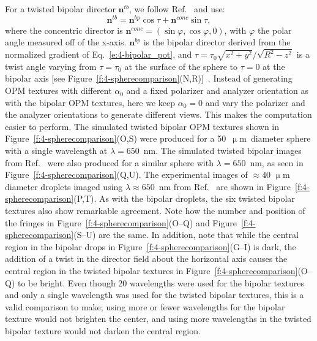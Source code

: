 For a twisted bipolar director $\mathbf{n}^{tb}$, we follow Ref.~\cite{RN177} and use:
\begin{equation}
\mathbf{n}^{tb} = \mathbf{n}^{bp}\cos\tau +\mathbf{n}^{conc}\sin\tau,
\end{equation}
where the concentric director is $\mathbf{n}^{conc} = (\sin \varphi,\cos \varphi,0)$, with $\varphi$ the polar angle measured off of the x-axis.
$\mathbf{n}^{bp}$ is the bipolar director derived from the normalized gradient of Eq.~\ref{e:4-bipolar_pot}, and $\tau = \tau_0\sqrt{x^2+y^2}/\sqrt{R^2-z^2}$ is a twist angle varying from $\tau=\tau_0$ at the surface of the sphere to $\tau=0$ at the bipolar axis [see Figure~\ref{f:4-spherecomparison}(N,R)]~\cite{RN177}.
Instead of generating OPM textures with different $\alpha_0$ and a fixed polarizer and analyzer orientation as with the bipolar OPM textures, here we keep $\alpha_0=0$ and vary the polarizer and the analyzer orientations to generate different views.
This makes the computation easier to perform.
The simulated twisted bipolar OPM textures shown in Figure~\ref{f:4-spherecomparison}(O,S) were produced for a 50~$\upmu$m~diameter sphere with a single wavelength at $\lambda = 650$~nm.
The simulated twisted bipolar images from Ref.~\cite{RN193} were also produced for a similar sphere with $\lambda = 650$~nm, as seen in Figure~\ref{f:4-spherecomparison}(Q,U).
The experimental images of $\approx 40$ $\upmu$m diameter droplets imaged using $\lambda \approx 650$~nm from Ref.~\cite{RN193} are shown in Figure~\ref{f:4-spherecomparison}(P,T).
As with the bipolar droplets, the six twisted bipolar textures also show remarkable agreement.
Note how the number and position of the fringes in Figure~\ref{f:4-spherecomparison}(O--Q) and Figure~\ref{f:4-spherecomparison}(S--U) are the same.
In addition, note that while the central region in the bipolar drops in Figure~\ref{f:4-spherecomparison}(G--I) is dark, the addition of a twist in the director field about the horizontal axis causes the central region in the twisted bipolar textures in Figure~\ref{f:4-spherecomparison}(O--Q) to be bright.
Even though 20 wavelengths were used for the bipolar textures and only a single wavelength was used for the twisted bipolar textures, this is a valid comparison to make; using more or fewer wavelengths for the bipolar texture would not brighten the center, and using more wavelengths in the twisted bipolar texture would not darken the central region.


